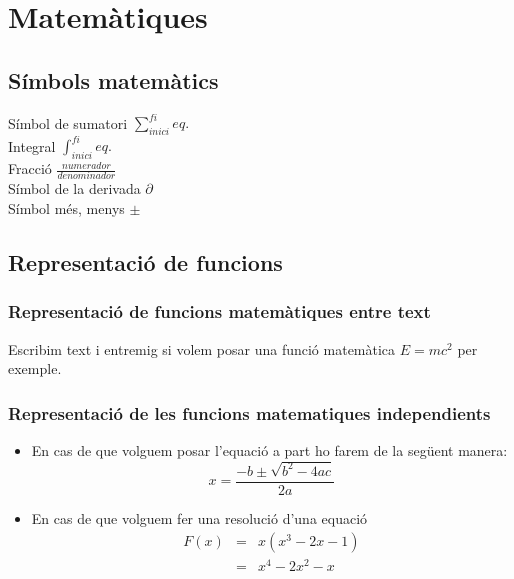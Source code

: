 \chapter{ Matemàtiques}

\section{Símbols matemàtics}

Símbol de sumatori $\sum_{inici}^{fi} eq.$ \\

Integral $\int_{inici}^{fi} eq.$\\

Fracció $\frac{numerador}{denominador}$\\

Símbol de la derivada $\partial$ \\

Símbol més, menys $\pm$

\section{Representació de funcions}
\subsection{Representació de funcions matemàtiques entre text}

Escribim text i entremig si volem posar una funció matemàtica $E=mc^2$ per exemple.

\subsection{Representació de les funcions matematiques independients}
\begin{itemize}
\item En cas de que volguem posar l'equació a part ho farem de la següent manera:
\begin{equation}
x=\frac{-b\pm\sqrt{b^2 - 4ac}}{2a}
\end{equation}
\item En cas de que volguem fer una resolució d'una equació
\begin{eqnarray*}
  \label{eq:fonamental}
  F(x) &=& x ( x^3 -2x - 1) \\
       &=& x^4 - 2x^2 - x \\
\end{eqnarray*}
\end{itemize}
